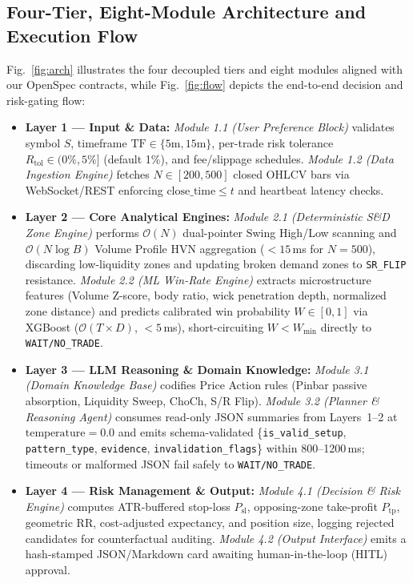 \documentclass[conference]{IEEEtran}
\begin{document}
\subsection{Four-Tier, Eight-Module Architecture and Execution Flow}
Fig.~\ref{fig:arch} illustrates the four decoupled tiers and eight modules aligned with our OpenSpec contracts, while Fig.~\ref{fig:flow} depicts the end-to-end decision and risk-gating flow:
\begin{itemize}
    \item \textbf{Layer 1 --- Input \& Data:} \textit{Module 1.1 (User Preference Block)} validates symbol $S$, timeframe $\mathrm{TF} \in \{\text{5m}, \text{15m}\}$, per-trade risk tolerance $R_{\text{tol}} \in (0\%, 5\%]$ (default 1\%), and fee/slippage schedules. \textit{Module 1.2 (Data Ingestion Engine)} fetches $N \in [200, 500]$ closed OHLCV bars via WebSocket/REST enforcing $\text{close\_time} \le t$ and heartbeat latency checks.
    \item \textbf{Layer 2 --- Core Analytical Engines:} \textit{Module 2.1 (Deterministic S\&D Zone Engine)} performs $\mathcal{O}(N)$ dual-pointer Swing High/Low scanning and $\mathcal{O}(N\log B)$ Volume Profile HVN aggregation ($<15$\,ms for $N=500$), discarding low-liquidity zones and updating broken demand zones to \texttt{SR\_FLIP} resistance. \textit{Module 2.2 (ML Win-Rate Engine)} extracts microstructure features (Volume Z-score, body ratio, wick penetration depth, normalized zone distance) and predicts calibrated win probability $W \in [0, 1]$ via XGBoost ($\mathcal{O}(T \times D)$, $<5$\,ms), short-circuiting $W < W_{\min}$ directly to \texttt{WAIT/NO\_TRADE}.
    \item \textbf{Layer 3 --- LLM Reasoning \& Domain Knowledge:} \textit{Module 3.1 (Domain Knowledge Base)} codifies Price Action rules (Pinbar passive absorption, Liquidity Sweep, ChoCh, S/R Flip). \textit{Module 3.2 (Planner \& Reasoning Agent)} consumes read-only JSON summaries from Layers~1--2 at $\text{temperature}=0.0$ and emits schema-validated \{\texttt{is\_valid\_setup}, \texttt{pattern\_type}, \texttt{evidence}, \texttt{invalidation\_flags}\} within 800--1200\,ms; timeouts or malformed JSON fail safely to \texttt{WAIT/NO\_TRADE}.
    \item \textbf{Layer 4 --- Risk Management \& Output:} \textit{Module 4.1 (Decision \& Risk Engine)} computes ATR-buffered stop-loss $P_{\text{sl}}$, opposing-zone take-profit $P_{\text{tp}}$, geometric $\mathrm{RR}$, cost-adjusted expectancy, and position size, logging rejected candidates for counterfactual auditing. \textit{Module 4.2 (Output Interface)} emits a hash-stamped JSON/Markdown card awaiting human-in-the-loop (HITL) approval.
\end{itemize}
\end{document}
